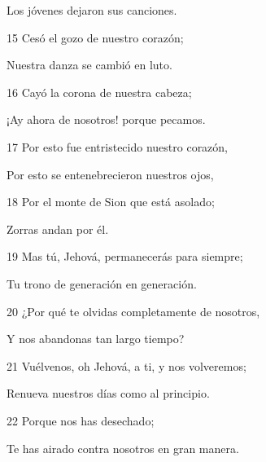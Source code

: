 \par Los jóvenes dejaron sus canciones.
\par 15 Cesó el gozo de nuestro corazón;
\par Nuestra danza se cambió en luto.
\par 16 Cayó la corona de nuestra cabeza;
\par ¡Ay ahora de nosotros! porque pecamos.
\par 17 Por esto fue entristecido nuestro corazón,
\par Por esto se entenebrecieron nuestros ojos,
\par 18 Por el monte de Sion que está asolado;
\par Zorras andan por él.
\par 19 Mas tú, Jehová, permanecerás para siempre;
\par Tu trono de generación en generación.
\par 20 ¿Por qué te olvidas completamente de nosotros,
\par Y nos abandonas tan largo tiempo?
\par 21 Vuélvenos, oh Jehová, a ti, y nos volveremos;
\par Renueva nuestros días como al principio.
\par 22 Porque nos has desechado;
\par Te has airado contra nosotros en gran manera.


